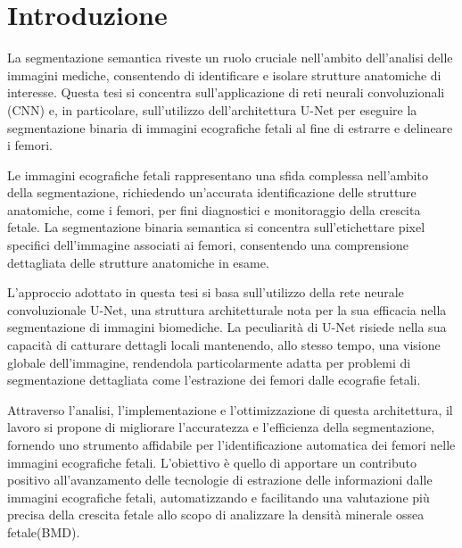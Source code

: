 
\chapter{Introduzione} \label{chap:Introduzione}

La segmentazione semantica riveste un ruolo cruciale nell'ambito dell'analisi
delle immagini mediche, consentendo di identificare e isolare strutture
anatomiche di interesse. Questa tesi si concentra sull'applicazione di reti
neurali convoluzionali (CNN) e, in particolare, sull'utilizzo dell'architettura
U-Net per eseguire la segmentazione binaria di immagini ecografiche fetali al
fine di estrarre e delineare i femori.

Le immagini ecografiche fetali rappresentano una sfida complessa nell'ambito
della segmentazione, richiedendo un'accurata identificazione delle strutture
anatomiche, come i femori, per fini diagnostici e monitoraggio della crescita
fetale. La segmentazione binaria semantica si concentra sull'etichettare pixel
specifici dell'immagine associati ai femori, consentendo una comprensione
dettagliata delle strutture anatomiche in esame.

L'approccio adottato in questa tesi si basa sull'utilizzo della rete neurale
convoluzionale U-Net, una struttura architetturale nota per la sua efficacia
nella segmentazione di immagini biomediche. La peculiarità di U-Net risiede
nella sua capacità di catturare dettagli locali mantenendo, allo stesso tempo,
una visione globale dell'immagine, rendendola particolarmente adatta per
problemi di segmentazione dettagliata come l'estrazione dei femori dalle
ecografie fetali.

Attraverso l'analisi, l'implementazione e l'ottimizzazione di questa
architettura, il lavoro si propone di migliorare l'accuratezza e l'efficienza
della segmentazione, fornendo uno strumento affidabile per l'identificazione
automatica dei femori nelle immagini ecografiche fetali. L'obiettivo è quello di
apportare un contributo positivo all'avanzamento delle tecnologie di estrazione
delle informazioni dalle immagini ecografiche fetali, automatizzando e
facilitando una valutazione più precisa della crescita fetale allo scopo di
analizzare la densità minerale ossea fetale(BMD).
